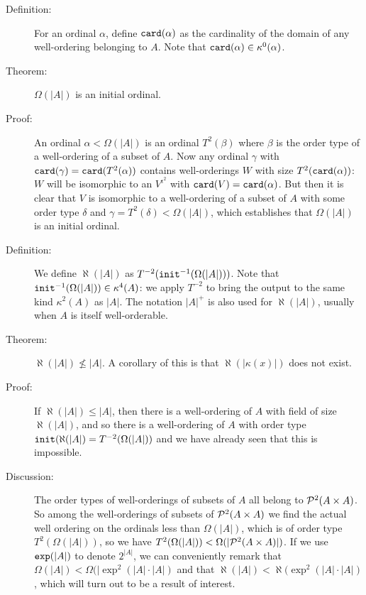\documentclass[12pt]{article}
\begin{document}
\begin{description}
\item[Definition:]  For an ordinal $\alpha$, define ${\tt card}(\alpha)$ as the cardinality of the domain of any well-ordering belonging to $A$.  Note that ${\tt card}(\alpha) \in \kappa^0(\alpha)$.

\item[Theorem:]  $\Omega(|A|)$ is an initial ordinal. 

\item[Proof:]  An ordinal $\alpha<\Omega(|A|)$ is an ordinal $T^2(\beta)$ where $\beta$ is the order type of a well-ordering of a subset of $A$.  Now any ordinal $\gamma$ with ${\tt card}(\gamma) = {\tt card}(T^2(\alpha))$ contains well-orderings $W$ with size $T^2({\tt card}(\alpha))$:  $W$ will be isomorphic to an $V^{\iota^2}$ with ${\tt card}(V)= {\tt card}(\alpha)$.  But then it is clear that $V$ is isomorphic to a well-ordering of a subset of $A$ with some order type $\delta$ and $\gamma=T^2(\delta)<\Omega(|A|)$, which establishes that $\Omega(|A|)$ is an initial ordinal.

\item[Definition:]  We define $\aleph(|A|)$ as $T^{-2}({\tt init}^{-1}(\Omega(|A|)))$.  Note that ${\tt init}^{-1}(\Omega(|A|))\in \kappa^4(A)$:  we apply $T^{-2}$ to bring the output to the same kind $\kappa^2(A)$ as $|A|$.  The notation
$|A|^+$ is also used for  $\aleph(|A|)$, usually when $A$ is itself well-orderable.

\item[Theorem:]  $\aleph(|A|) \not\leq |A|$.   A corollary of this is that $\aleph(|\kappa(x)|)$ does not exist.

\item[Proof:]  If $\aleph(|A|) \leq |A|$, then there is a well-ordering of $A$ with field of size $\aleph(|A|)$, and so there is a well-ordering of $A$ with order type ${\tt init}(\aleph(|A|) = T^{-2}(\Omega(|A|))$ and we have already seen that this is impossible.

\item[Discussion:]  The order types of well-orderings of subsets of $A$ all belong to ${\cal P}^2(A \times A)$.  So among the well-orderings of subsets of ${\cal P}^2(A \times A)$ we find the actual well ordering on the ordinals less than  $\Omega(|A|)$, which is of order type $T^2(\Omega(|A|))$, so we have $T^2(\Omega(|A|))<\Omega(|{\cal P}^2(A \times A)|)$.  If we use ${\tt exp}(|A|)$ to denote $2^{|A|}$, we can conveniently remark that $\Omega(|A|)<\Omega(|\exp^2(|A|\cdot |A|)$ and that $\aleph(|A|)<\aleph(\exp^2(|A|\cdot |A|)$, which will turn out to be a result of interest.


\end{description}
\end{document}

